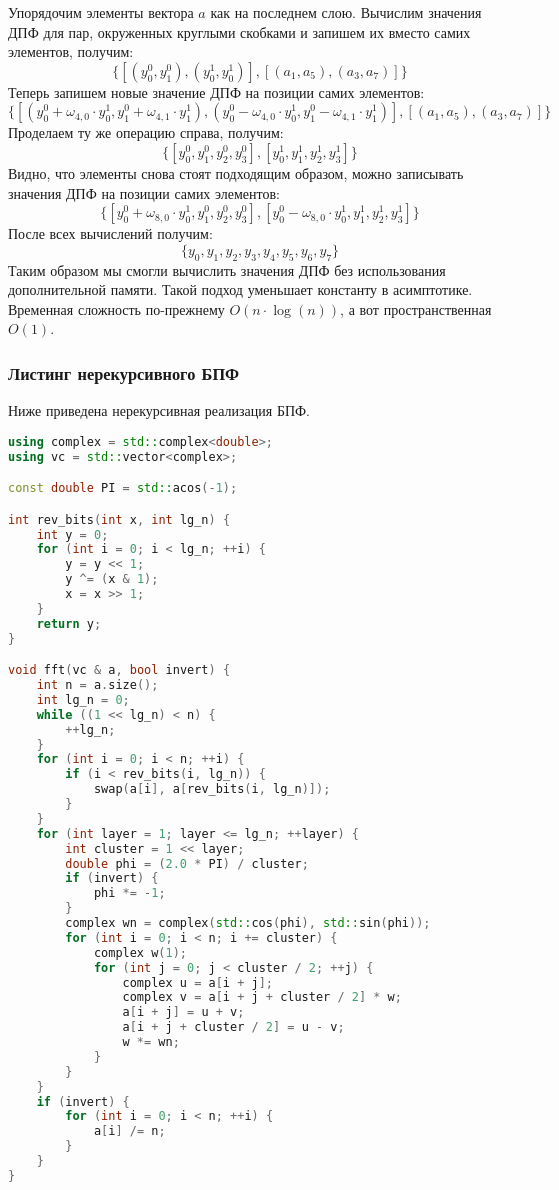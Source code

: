 Упорядочим элементы вектора $a$ как на последнем слою. Вычислим значения ДПФ для пар, окруженных круглыми скобками и запишем их вместо самих элементов, получим:
$$\{ [ (y^0_0, y^0_1), (y^1_0, y^1_0) ], [(a_1, a_5), (a_3, a_7)] \}$$
Теперь запишем новые значение ДПФ на позиции самих элементов:
$$\{ [ (y^0_0 + {\omega_{4, 0} } \cdot y^1_0, y^0_1 + {\omega_{4, 1} } \cdot y^1_1), (y^0_0 - {\omega_{4, 0} } \cdot y^1_0, y^0_1 - {\omega_{4, 1} } \cdot y^1_1) ], [(a_1, a_5), (a_3, a_7)] \}$$
Проделаем ту же операцию справа, получим:
$$ \{ [ y^0_0, y^0_1, y^0_2, y^0_3 ], [ y^1_0, y^1_1, y^1_2, y^1_3 ] \} $$
Видно, что элементы снова стоят подходящим образом, можно записывать значения ДПФ на позиции самих элементов:
$$ \{ [ y^0_0 + {\omega_{8, 0} } \cdot y^1_0, y^0_1, y^0_2, y^0_3 ], [ y^0_0 - {\omega_{8, 0} } \cdot y^1_0, y^1_1, y^1_2, y^1_3 ] \} $$
После всех вычислений получим:
$$ \{ y_0, y_1, y_2, y_3, y_4, y_5, y_6, y_7 \} $$
Таким образом мы смогли вычислить значения ДПФ без использования дополнительной памяти. Такой подход уменьшает константу в асимптотике. Временная сложность по-прежнему $O(n \cdot \log(n))$, а вот пространственная $O(1)$.

\subsubsection*{Листинг нерекурсивного БПФ}
Ниже приведена нерекурсивная реализация БПФ.
\begin{lstlisting}[language=C++]
using complex = std::complex<double>;
using vc = std::vector<complex>;

const double PI = std::acos(-1);

int rev_bits(int x, int lg_n) {
    int y = 0;
    for (int i = 0; i < lg_n; ++i) {
        y = y << 1;
        y ^= (x & 1);
        x = x >> 1;
    }
    return y;
}

void fft(vc & a, bool invert) {
    int n = a.size();
    int lg_n = 0;
    while ((1 << lg_n) < n) {
        ++lg_n;
    }
    for (int i = 0; i < n; ++i) {
        if (i < rev_bits(i, lg_n)) {
            swap(a[i], a[rev_bits(i, lg_n)]);
        }
    }
    for (int layer = 1; layer <= lg_n; ++layer) {
        int cluster = 1 << layer;
        double phi = (2.0 * PI) / cluster;
        if (invert) {
            phi *= -1;
        }
        complex wn = complex(std::cos(phi), std::sin(phi));
        for (int i = 0; i < n; i += cluster) {
            complex w(1);
            for (int j = 0; j < cluster / 2; ++j) {
                complex u = a[i + j];
                complex v = a[i + j + cluster / 2] * w;
                a[i + j] = u + v;
                a[i + j + cluster / 2] = u - v;
                w *= wn;
            }
        }
    }
    if (invert) {
        for (int i = 0; i < n; ++i) {
            a[i] /= n;
        }
    }
}
\end{lstlisting}


